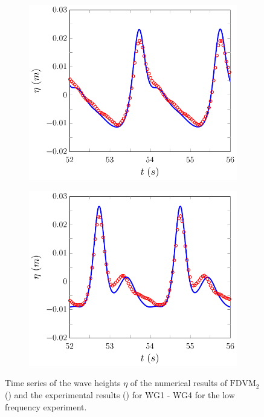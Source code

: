 \begin{figure}
\begin{subfigure}{0.5\textwidth}
		\vspace{0.5cm}
	\end{subfigure}
	\begin{subfigure}{0.5\textwidth}
		\includegraphics[width=\textwidth]{./chp6/figures/Experiment/Beji/sl/FDVMWG3.pdf}
		\vspace{0.5cm}
	\end{subfigure}%
	\begin{subfigure}{0.5\textwidth}
		\includegraphics[width=\textwidth]{./chp6/figures/Experiment/Beji/sl/FDVMWG4.pdf}
		\vspace{0.5cm}
	\end{subfigure}
	\caption{Time series of the wave heights $\eta$ of the numerical results of $\text{FDVM}_2$ ({\color{blue}\solidrule}) and the experimental results () for WG1 - WG4 for the low frequency experiment.}
	\label{fig:BejislWG1to4FDVM}
\end{figure}

